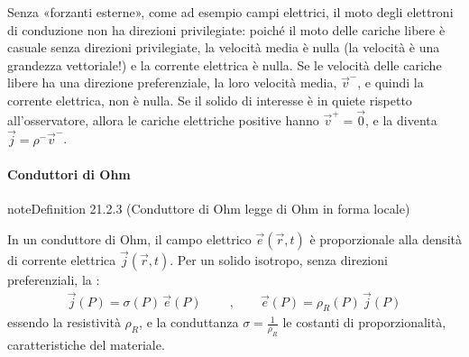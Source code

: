 \documentclass[letterpaper,10pt,italian]{jupyterBook}
\begin{document}
\sphinxAtStartPar
Senza «forzanti esterne», come ad esempio campi elettrici, il moto degli elettroni di conduzione non ha direzioni privilegiate: poiché il moto delle cariche libere è casuale senza direzioni privilegiate, la velocità media è nulla (la velocità è una grandezza vettoriale!) e la corrente elettrica è nulla. Se le velocità delle cariche libere ha una direzione preferenziale, la loro velocità media, \(\vec{v}^-\), e quindi la corrente elettrica, non è nulla. Se il solido di interesse è in quiete rispetto all’osservatore, allora le cariche elettriche positive hanno \(\vec{v}^+ = \vec{0}\), e la {\hyperref[\detokenize{ch/electromagnetism/electric-current:electric-current-density-def}]{}} diventa \(\vec{j} = \rho^- \vec{v}^-\).




\paragraph{Conduttori di Ohm}
\label{\detokenize{ch/electromagnetism/electric-current:conduttori-di-ohm}}\label{\detokenize{ch/electromagnetism/electric-current:physics-hs-electromagnetism-electric-current-solids-conductor-ohm}}\label{ch/electromagnetism/electric-current:ohm-local}
\begin{sphinxadmonition}{note}{Definition 21.2.3 (Conduttore di Ohm \sphinxhyphen{} legge di Ohm in forma locale)}



\sphinxAtStartPar
In un conduttore di Ohm, il campo elettrico \(\vec{e}(\vec{r},t)\) è proporzionale alla densità di corrente elettrica \(\vec{j}(\vec{r},t)\). Per un solido isotropo, senza direzioni preferenziali, la :
\begin{equation}\label{equation:ch/electromagnetism/electric-current:ohm:local}
\begin{split}
\vec{j}(P) = \sigma(P) \, \vec{e}(P)
\qquad \ , \qquad
\vec{e}(P) = \rho_R(P) \, \vec{j}(P)
\end{split}
\end{equation}
\sphinxAtStartPar
essendo la resistività \(\rho_R\), e la conduttanza \(\sigma = \frac{1}{\rho_R}\) le costanti di proporzionalità, caratteristiche del materiale.
\end{sphinxadmonition}
\end{document}
